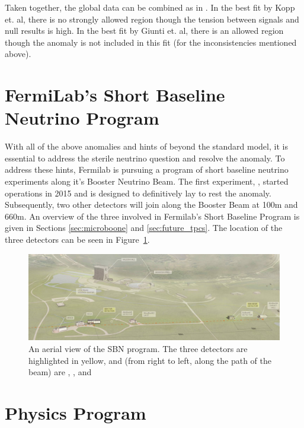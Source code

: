 Taken together, the global data can be combined as in \cite{Kopp:2013vaa,Giunti:2011gz}.  In the best fit by Kopp et. al, there is no strongly allowed region though the tension between signals and null results is high.  In the best fit by Giunti et. al, there is an allowed region though the \MB anomaly is not included in this fit (for the inconsistencies mentioned above).


\section{FermiLab's Short Baseline Neutrino Program}

\label{sec:sbn_detectors}
With all of the above anomalies and hints of beyond the standard model, it is essential to address the sterile neutrino question and resolve the \MB anomaly.  To address these hints, Fermilab is pursuing a program of short baseline neutrino experiments along it's Booster Neutrino Beam.  The first experiment, \uboone, started operations in 2015 and is designed to definitively lay to rest the \MB anomaly.  Subsequently, two other detectors will join \uboone along the Booster Beam at 100m and 660m.  An overview of the three \lartpcs involved in Fermilab's Short Baseline Program is given in Sections \ref{sec:microboone} and \ref{sec:future_tpcs}.  The location of the three detectors can be seen in Figure~\ref{fig:sbn_birdseyeview}.

\begin{figure}[htbp]
  \centering
  \includegraphics[width=\textwidth]{sbn_figures/SBN_Map.jpeg}
  \caption[SBN Detector Locations]{An aerial view of the SBN program.  The three detectors are highlighted in yellow, and (from right to left, along the path of the beam) are \sbnd, \uboone, and \icarus}
  \label{fig:sbn_birdseyeview}
\end{figure}

\section{Physics Program}

